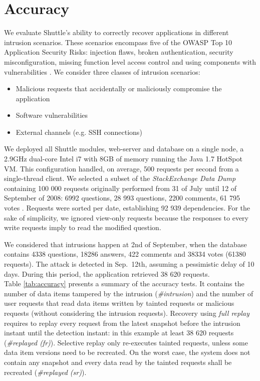 \section{Accuracy}\label{sec:eval:accuracy}

We evaluate Shuttle's ability to correctly recover applications in different intrusion scenarios. These scenarios encompass five of the \acf{OWASP} Top 10 Application Security Risks: injection flaws, broken authentication, security misconfiguration, missing function level access control and using components with vulnerabilities \cite{Williams2013}. We consider three classes of intrusion scenarios:
\begin{itemize}
  \item Malicious requests that accidentally or maliciously compromise the application
  \item Software vulnerabilities
  \item External channels (e.g. \ac{SSH} connections)
\end{itemize}

We deployed all Shuttle modules, web-server and database on a single node, a 2.9GHz dual-core Intel i7 with 8GB of memory running the Java 1.7 HotSpot \acf{VM}. This configuration handled, on average, 500 requests per second from a single-thread client. We selected a subset of the \textit{StackExchange Data Dump} \cite{stackexchange_data} containing 100 000 requests originally performed from 31 of July until 12 of September of 2008: 6992 questions, 28 993 questions, 2200 comments, 61 795 votes . Requests were sorted per date, establishing 92 939 dependencies. For the sake of simplicity, we ignored view-only requests because the responses to every write requests imply to read the modified question.  

We considered that intrusions happen at 2nd of September, when the database contains 4338 questions, 18286 answers, 422 comments and 38334 votes (61380 requests). The attack is detected in Sep.~12th, assuming a pessimistic delay of 10 days. During this period, the application retrieved 38 620 requests.\\

Table \ref{tab:accuracy} presents a summary of the accuracy tests. It contains the number of data items tampered by the intrusion (\emph{\#intrusion}) and the number of user requests that read data items written by  tainted requests or malicious requests (without considering the intrusion requests). Recovery using \textit{full replay} requires to replay every request from the latest snapshot before the intrusion instant until the detection instant: in this example at least 38 620 requests (\emph{\#replayed (fr)}). Selective replay only re-executes tainted requests, unless some data item versions need to be recreated. On the worst case, the system does not contain any snapshot and every data read by the tainted requests shall be recreated (\emph{\#replayed (sr)}). 

